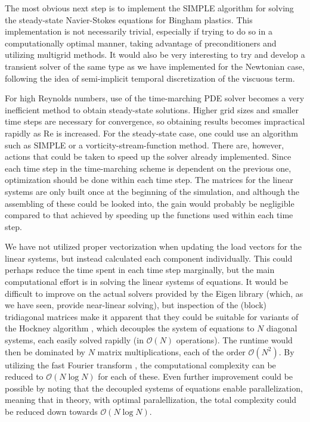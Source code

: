 \documentclass[final,3p,twocolumn]{elsarticle}
\begin{document}
The most obvious next step is to implement the SIMPLE algorithm for solving the
steady-state Navier-Stokes equations for Bingham plastics. This implementation
is not necessarily trivial, especially if trying to do so in a computationally
optimal manner, taking advantage of preconditioners and utilizing multigrid
methods. It would also be very interesting to try and develop a transient
solver of the same type as we have implemented for the Newtonian case,
following the idea of semi-implicit temporal discretization of the viscuous
term. 

For high Reynolds numbers, use of the time-marching PDE solver becomes a very
inefficient method to obtain steady-state solutions. Higher grid sizes and
smaller time steps are necessary for convergence, so obtaining results becomes
impractical rapidly as Re is increased. For the steady-state case, one could
use an algorithm such as SIMPLE or a vorticity-stream-function method.  There
are, however, actions that could be taken to speed up the solver already
implemented. Since each time step in the time-marching scheme is dependent on
the previous one, optimization should be done within each time step. The
matrices for the linear systems are only built once at the beginning of the
simulation, and although the assembling of these could be looked into, the gain
would probably be negligible compared to that achieved by speeding up the
functions used within each time step. 

We have not utilized proper vectorization when updating the load vectors for
the linear systems, but instead calculated each component individually. This
could perhaps reduce the time spent in each time step marginally, but the main
computational effort is in solving the linear systems of equations. It would be
difficult to improve on the actual solvers provided by the Eigen library
(which, as we have seen, provide near-linear solving), but inspection of the
(block) tridiagonal matrices make it apparent that they could be suitable for
variants of the Hockney algorithm \cite{hockney1965fast}, which decouples the
system of equations to $N$ diagonal systems, each easily solved rapidly (in
$\mathcal{O}(N)$ operations). The runtime would then be dominated by $N$ matrix
multiplications, each of the order $\mathcal{O}(N^2)$.  By utilizing the fast
Fourier transform \cite{cooley1965algorithm}, the computational complexity can
be reduced to $\mathcal{O}(N \log N)$ for each of these. Even further
improvement could be possible by noting that the decoupled systems of equations
enable parallelization, meaning that in theory, with optimal paralellization,
the total complexity could be reduced down towards $\mathcal{O}(N \log N)$. 
\end{document}
